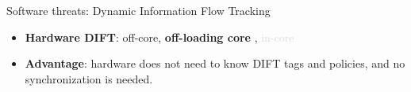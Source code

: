 \begin{frame}{Software threats: Dynamic Information Flow Tracking}
    \begin{minipage}[c]{0.45\textwidth}
        \begin{block}{}
            \begin{itemize}
                [square]
                \justifying
                    \item \textbf{Hardware DIFT}: off-core, \textbf{off-loading core} \cite{CKSFGMRRRV-08-sigarch}, \textcolor{Gainsboro}{in-core}
            \end{itemize}
        \end{block}
        \begin{exampleblock}{}
            \begin{itemize}
                [square]
                \justifying
                \item \textbf{Advantage}: hardware does not need to know DIFT tags and policies, and no synchronization is needed.
            \end{itemize}
        \end{exampleblock}
        

\end{minipage}
\end{frame}
